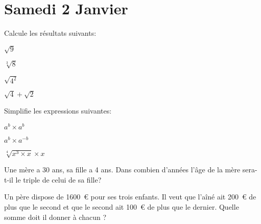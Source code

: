 \section{Samedi 2 Janvier}



\begin{exercice}
    Calcule les résultats suivants:
    \begin{exerciceenum}
        \item $\sqrt{9}$
        \item $\sqrt[3]{8}$
        \item $\sqrt{4^2}$
        \item $\sqrt{4} + \sqrt{2}$
    \end{exerciceenum}
\end{exercice}

\begin{exercice}
    Simplifie les expressions suivantes:
    \begin{exerciceenum}
        \item $a^b \times a^b$
        \item $a^b \times a^{-b}$
        \item $\sqrt[4]{x^3 \times x} \times x$
    \end{exerciceenum}
\end{exercice}

\begin{exercice}
    Une mère a 30 ans, sa fille a 4 ans. Dans combien d'années l'âge de la mère sera-t-il le triple de celui de sa fille?
\end{exercice}

\begin{exercice}
    Un père dispose de 1600~€ pour ses trois enfants. Il veut que l'aîné ait 200~€ de plus que le second et que le second ait 100~€ de plus que le dernier. Quelle somme doit il donner à chacun ?
\end{exercice}

